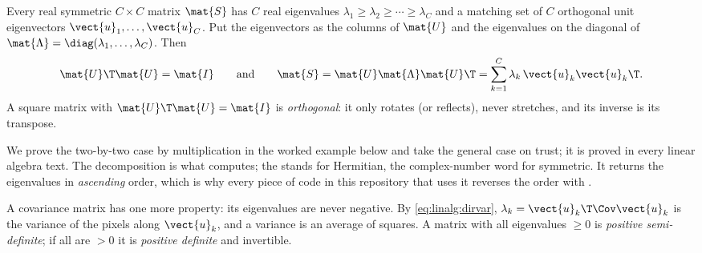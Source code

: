 \begin{definition}
Every real symmetric $C\times C$ matrix $\mat{S}$ has $C$ real eigenvalues
$\lambda_1 \ge \lambda_2 \ge \cdots \ge \lambda_C$ and a matching set of $C$ orthogonal unit
eigenvectors $\vect{u}_1, \dots, \vect{u}_C$. Put the eigenvectors as the columns of
$\mat{U}$ and the eigenvalues on the diagonal of $\mat{\Lambda} = \diag(\lambda_1, \dots,
\lambda_C)$. Then
\begin{equation}\label{eq:linalg:spectral}
\mat{U}\T\mat{U} = \mat{I}
\qquad\text{and}\qquad
\mat{S} = \mat{U}\mat{\Lambda}\mat{U}\T = \sum_{k=1}^{C}\lambda_k\,\vect{u}_k\vect{u}_k\T .
\end{equation}
A square matrix with $\mat{U}\T\mat{U} = \mat{I}$ is \emph{orthogonal}:
it only rotates (or reflects), never stretches, and its inverse is its transpose.
\end{definition}

We prove the two-by-two case by multiplication in the worked example below and take the general
case on trust; it is proved in every linear algebra text. The decomposition is what
 computes; the  stands for Hermitian, the complex-number word for
symmetric. It returns the eigenvalues in \emph{ascending} order, which is why every piece of code
in this repository that uses it reverses the order with .

A covariance matrix has one more property: its eigenvalues are never negative. By
\cref{eq:linalg:dirvar}, $\lambda_k = \vect{u}_k\T\Cov\vect{u}_k$ is the variance of the pixels
along $\vect{u}_k$, and a variance is an average of squares. A matrix with all eigenvalues
$\ge 0$ is \emph{positive semi-definite}; if all are $>0$ it is
\emph{positive definite} and invertible.

